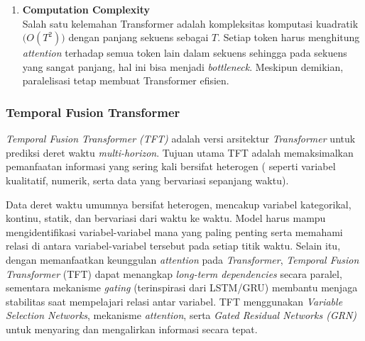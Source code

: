 \begin{enumerate}
\(\mathbf{H}\) adalah \textit{input layer}, \(\mathbf{H}'\) adalah \textit{output} sub-lapisan \textit{self-attention}, dan \(\mathbf{H}^{\star}\) menjadi \textit{outpu} akhir setelah melalui sub-lapisan \textit{feed-forward}. Proses serupa diterapkan pada \textit{decoder}, dengan perbedaan utama adanya:
\begin{itemize}
    \item \textbf{Masked self-attention} pada \textit{decoder} untuk mencegah model megambil informasi token masa depan ketika memprediksi token saat ini.
    \item \textbf{Cross-attention} pada \textit{decoder} yang mengambil \(\mathbf{H}^{\star}_{\text{encoder}}\) sebagai \((K, V)\), sementara \(\mathbf{h}_\text{decoder}\) berperan sebagai \(Q\).
\end{itemize}

\item \textbf{Computation Complexity} \\
Salah satu kelemahan Transformer adalah kompleksitas komputasi kuadratik \(\bigl(O(T^2)\bigr)\) dengan panjang sekuens sebagai \(T\). Setiap token harus menghitung \textit{attention} terhadap semua token lain dalam sekuens sehingga pada sekuens yang sangat panjang, hal ini bisa menjadi \textit{bottleneck}. Meskipun demikian, paralelisasi tetap membuat Transformer efisien.

\end{enumerate}


 \subsubsection{Temporal Fusion Transformer}
\textit{Temporal Fusion Transformer (TFT)} \parencite{Lim2020} adalah versi arsitektur \textit{Transformer} untuk prediksi deret waktu \textit{multi-horizon}. Tujuan utama TFT adalah memaksimalkan pemanfaatan informasi yang sering kali bersifat heterogen ( seperti variabel kualitatif, numerik, serta data yang bervariasi sepanjang waktu).

Data deret waktu umumnya bersifat heterogen, mencakup variabel kategorikal, kontinu, statik, dan bervariasi dari waktu ke waktu. Model harus mampu mengidentifikasi variabel-variabel mana yang paling penting serta memahami relasi di antara variabel-variabel tersebut pada setiap titik waktu. Selain itu, dengan memanfaatkan keunggulan \textit{attention} pada \textit{Transformer}, \textit{Temporal Fusion Transformer} (TFT) dapat menangkap \textit{long-term dependencies} secara paralel, sementara mekanisme \textit{gating} (terinspirasi dari LSTM/GRU) membantu menjaga stabilitas saat mempelajari relasi antar variabel. TFT menggunakan \textit{Variable Selection Networks}, mekanisme \textit{attention}, serta \textit{Gated Residual Networks (GRN)} untuk menyaring dan mengalirkan informasi secara tepat.

